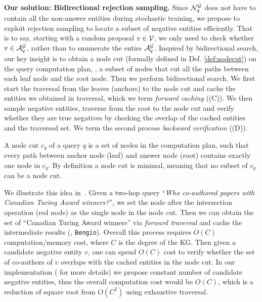 \textbf{Our solution: Bidirectional rejection sampling.}
Since $\mathcal{N}_q^{\mathcal{G}}$ does not have to contain all the non-answer entities during stochastic training, we propose to exploit rejection sampling to locate a subset of negative entities efficiently. That is to say, starting with a random proposal $v \in \mathcal{V}$, we only need to check whether $v \in \mathcal{A}_q^{\mathcal{G}}$, rather than to enumerate the entire $\mathcal{A}_q^{\mathcal{G}}$. Inspired by bidirectional search, our key insight is to obtain a node cut (formally defined in Def. \ref{def:nodecut}) on the query computation plan, \ie, a subset of nodes that cut all the paths between each leaf node and the root node. Then we perform bidirectional search. We first start the traversal from the leaves (anchors) to the node cut and cache the entities we obtained in traversal, which we term \emph{forward caching} ((C)). We then sample negative entities, traverse from the root to the node cut and verify whether they are true negatives by checking the overlap of the cached entities and the traversed set. We term the second process \emph{backward verification} ((D)).


\begin{definition}\label{def:nodecut}
	A node cut $c_q$ of a query $q$ is a set of nodes in the computation plan, such that every path between anchor node (leaf) and answer node (root) contains exactly one node in $c_q$. By definition a node cut is minimal, meaning that no subset of $c_q$ can be a node cut.
\end{definition}


We illustrate this idea in~. Given a two-hop query ``\textit{Who co-authored papers with Canadian Turing Award winners?}'', we set the node after the intersection operation (red node) as the single node in the node cut. Then we can obtain the set of ``Canadian Turing Award winners'' via \textit{forward traversal} and cache the intermediate results (\ie, \texttt{Bengio}). 
% 
Overall this process requires $O(C)$ computation/memory cost, where $C$ is the degree of the KG. 
% 
Then given a candidate negative entity $v$, one can spend $O(C)$ cost to verify whether the set of co-authors of $v$ overlaps with the cached entities in the node cut.
In our implementation ( for more details) we propose constant number of candidate negative entities, thus the overall computation cost would be $O(C)$, which is a reduction of square root from $O(C^2)$ using exhaustive traversal. 

